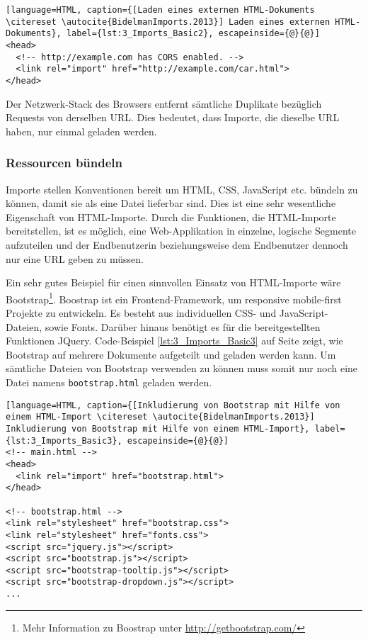 \begin{lstlisting}[language=HTML, caption={[Laden eines externen HTML-Dokuments \citereset \autocite{BidelmanImports.2013}] Laden eines externen HTML-Dokuments}, label={lst:3_Imports_Basic2}, escapeinside={@}{@}]
<head>
  <!-- http://example.com has CORS enabled. -->
  <link rel="import" href="http://example.com/car.html">
</head>
\end{lstlisting}

Der Netzwerk-Stack des Browsers entfernt sämtliche Duplikate bezüglich Requests von derselben URL. Dies bedeutet, dass Importe, die dieselbe URL haben, nur einmal geladen werden.

\subsubsection{Ressourcen bündeln}

Importe stellen Konventionen bereit um HTML, CSS, JavaScript etc. bündeln zu können, damit sie als eine Datei lieferbar sind. Dies ist eine sehr wesentliche Eigenschaft von HTML-Importe. Durch die Funktionen, die HTML-Importe bereitstellen, ist es möglich, eine Web-Applikation in einzelne, logische Segmente aufzuteilen und der Endbenutzerin beziehungsweise dem Endbenutzer dennoch nur eine URL geben zu müssen.

Ein sehr gutes Beispiel für einen sinnvollen Einsatz von HTML-Importe wäre Bootstrap\footnote{Mehr Information zu Boostrap unter \href{http://getbootstrap.com/}{http://getbootstrap.com/}}. Boostrap ist ein Frontend-Framework, um responsive mobile-first Projekte zu entwickeln. Es besteht aus individuellen CSS- und JavaScript-Dateien, sowie Fonts. Darüber hinaus benötigt es für die bereitgestellten Funktionen JQuery. Code-Beispiel \ref{lst:3_Imports_Basic3} auf Seite \pageref{lst:3_Imports_Basic3} zeigt, wie Bootstrap auf mehrere Dokumente aufgeteilt und geladen werden kann. Um sämtliche Dateien von Bootstrap verwenden zu können muss somit nur noch eine Datei namens \lstinline|bootstrap.html| geladen werden.

\begin{lstlisting}[language=HTML, caption={[Inkludierung von Bootstrap mit Hilfe von einem HTML-Import \citereset \autocite{BidelmanImports.2013}] Inkludierung von Bootstrap mit Hilfe von einem HTML-Import}, label={lst:3_Imports_Basic3}, escapeinside={@}{@}]
<!-- main.html -->
<head>
  <link rel="import" href="bootstrap.html">
</head>

<!-- bootstrap.html -->
<link rel="stylesheet" href="bootstrap.css">
<link rel="stylesheet" href="fonts.css">
<script src="jquery.js"></script>
<script src="bootstrap.js"></script>
<script src="bootstrap-tooltip.js"></script>
<script src="bootstrap-dropdown.js"></script>
...
\end{lstlisting}

